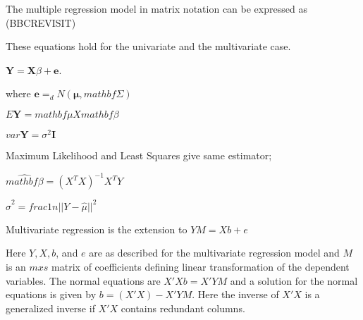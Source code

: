 The multiple regression model in matrix notation can be expressed
as
(BBCREVISIT)

These equations hold for the univariate and the multivariate case.

$\textbf{Y} = \textbf{X}{\beta} + \textbf{e}$.

where $\textbf{e} =_d N(\mathbf{\mu},mathbf{\Sigma})$

$E \textbf{Y} = mathbf{\mu} X mathbf{\beta}$

$var \textbf{Y} = \sigma^2 \textbf{I}$

Maximum Likelihood and Least Squares give same estimator;

$\widehat{mathbf{\beta}}=(X^TX)^{-1} X^T Y$

$\hat{\sigma}^2 = frac{1}{n} || Y- \hat{\mu} ||^2$

Multivariate regression is the extension to $YM = Xb + e$

Here $Y, X, b$, and $e$ are as described for the multivariate regression model and $M$ is an $m x s$ matrix of coefficients defining linear transformation of the dependent variables. The normal equations are $X'Xb = X'YM$ and a solution for the normal equations is given by $b = (X'X)-X'YM$. Here the inverse of $X'X$ is a generalized inverse if $X'X$ contains
redundant columns.




